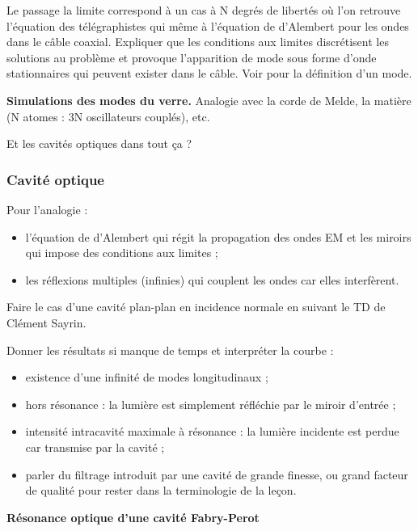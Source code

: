 Le passage la limite correspond à un cas à N degrés de libertés où l'on retrouve l'équation des télégraphistes qui même à l'équation de d'Alembert pour les ondes dans le câble coaxial.
Expliquer que les conditions aux limites discrétisent les solutions au problème et provoque l'apparition de mode sous forme d'onde stationnaires qui peuvent exister dans le câble.
Voir \cite{Taillet2018} pour la définition d'un mode.


\begin{slide}
\textbf{Simulations des modes du verre.}
Analogie avec la corde de Melde, la matière (N atomes : 3N oscillateurs couplés), etc.
\end{slide}

\begin{transition}
Et les cavités optiques dans tout ça ?
\end{transition}

\subsubsection{Cavité optique}

Pour l'analogie :
\begin{itemize}
\item l'équation de d'Alembert qui régit la propagation des ondes EM et les miroirs qui impose des conditions aux limites ;
\item les réflexions multiples (infinies) qui couplent les ondes car elles interfèrent.
\end{itemize}
Faire le cas d'une cavité plan-plan en incidence normale en suivant le TD de Clément Sayrin.

Donner les résultats si manque de temps et interpréter la courbe :
\begin{itemize}
\item existence d'une infinité de modes longitudinaux ;
\item hors résonance : la lumière est simplement réfléchie par le miroir d'entrée ;
\item intensité intracavité  maximale à résonance : la lumière incidente est perdue car transmise par la cavité ;
\item parler du filtrage introduit par une cavité de grande finesse, ou grand facteur de qualité pour rester dans la terminologie de la leçon.
\end{itemize}

\begin{slide}
\textbf{Résonance optique d'une cavité Fabry-Perot}
\end{slide}

